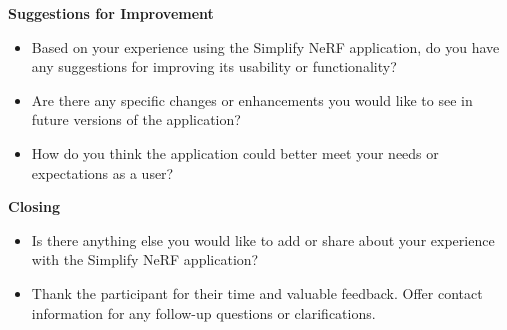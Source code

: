 \newpage 

\textbf{Suggestions for Improvement}
\begin{itemize}
\item Based on your experience using the Simplify NeRF application, do you have any suggestions for improving its usability or functionality?
\item Are there any specific changes or enhancements you would like to see in future versions of the application?
\item How do you think the application could better meet your needs or expectations as a user?
\end{itemize}

\textbf{Closing}
\begin{itemize}
\item Is there anything else you would like to add or share about your experience with the Simplify NeRF application?
\item Thank the participant for their time and valuable feedback.
Offer contact information for any follow-up questions or clarifications.
\end{itemize}


